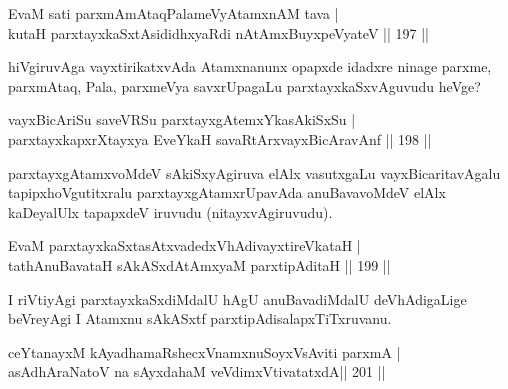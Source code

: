 \begin{shl}
EvaM sati parxmAmAtaqPalameVyAtamxnAM tava | \\
kutaH parxtayxkaSxtAsididhxyaRdi nA\s \s tAmx\s BuyxpeVyateV \hfill ||  197 ||  
\end{shl}

\begin{artha}
hiVgiruvAga vayxtirikatxvAda Atamxnanunx opapxde idadxre ninage parxme, parxmAtaq, Pala, parxmeVya savxrUpagaLu parxtayxkaSxvAguvudu heVge?
\end{artha}

\begin{shl}
vayxBicAriSu saveVRSu parxtayxgAtemxYkasAkiSxSu | \\
parxtayxkapxrXtayxya EveYkaH savaRtArxvayxBicAravAnf \hfill ||  198 ||  
\end{shl}

\begin{artha}
parxtayxgAtamxvoMdeV sAkiSxyAgiruva elAlx vasutxgaLu vayxBicaritavAgalu tapipxhoVgutitxralu parxtayxgAtamxrUpavAda anuBavavoMdeV elAlx kaDeyalUlx tapapxdeV iruvudu (nitayxvAgiruvudu).
\end{artha}

\begin{shl}
EvaM parxtayxkaSxtasAtxvadedxVhAdivayxtireVkataH | \\
tathA\s nuBavataH sAkASxdAtAmx\s yaM parxtipAditaH \hfill ||  199 ||  
\end{shl}

\begin{artha}
I riVtiyAgi parxtayxkaSxdiMdalU hAgU anuBavadiMdalU deVhAdigaLige beVreyAgi I Atamxnu sAkASxtf parxtipAdisalapxTiTxruvanu.
\end{artha}


\begin{shl}
ceYtanayxM kAyadhamaRshecxVnamxnuSoyxV\s sAviti parxmA | \\
asAdhAraNatoV na sAyxdahaM veVdimxVtivatatxdA\hfill  || 201 ||  
\end{shl}

